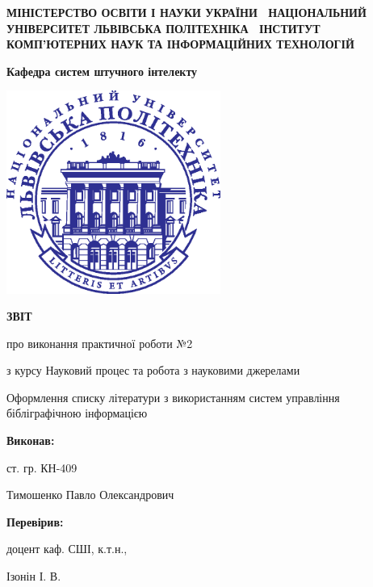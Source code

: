 \documentclass[oneside,14pt,a4paper]{extreport}
\newcommand \labno    {2}
\newcommand \course   {Науковий процес та робота з науковими джерелами}
\newcommand \group    {409}
\newcommand \lecturer {Ізонін І. В.}
\newcommand \theme    {Оформлення списку літератури з використанням систем управління бібліграфічною інформацією}
\begin{document}
\begin{titlepage}

\centering
 \textbf{
  МІНІСТЕРСТВО ОСВІТИ І НАУКИ УКРАЇНИ \
  НАЦІОНАЛЬНИЙ УНІВЕРСИТЕТ \flqq{}ЛЬВІВСЬКА ПОЛІТЕХНІКА\frqq{} \
  ІНСТИТУТ КОМП’ЮТЕРНИХ НАУК ТА ІНФОРМАЦІЙНИХ ТЕХНОЛОГІЙ
 }

\vspace{0.5cm}
 \textbf{
  Кафедра систем штучного інтелекту
}

\vspace*{\fill}

  {
    \centering
    \includegraphics[width=7cm]{imgs/logo.eps}
  }

\vspace{1cm}

  {\textbf{ЗВІТ} \par{}
  {про виконання практичної роботи №\labno}
   \par}
  {з курсу \flqq{}\course\frqq{} \par}

\vspace{1cm} \theme

\raggedleft\vfill

 {\textbf{Виконав:} \par}
 {ст. гр. КН-\group \par}
 {Тимошенко Павло Олександрович \par}


 {\textbf{Перевірив:} \par}
 {доцент каф. СШІ, к.т.н.,}
 {\lecturer \par}

\vspace{1cm}


\end{titlepage}
\end{document}
